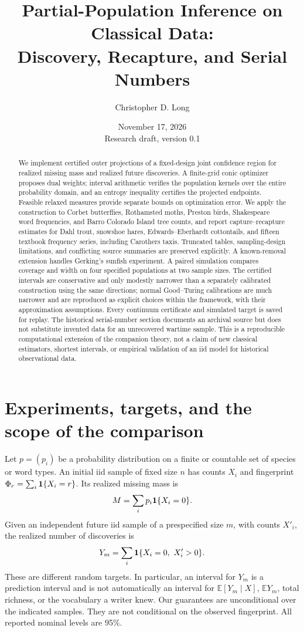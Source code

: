 \documentclass[11pt]{article}
\title{Partial-Population Inference on Classical Data:\\Discovery, Recapture, and Serial Numbers}
\author{Christopher D. Long}
\date{November 17, 2026\\Research draft, version 0.1}
\theoremstyle{remark}\newtheorem{remark}[theorem]{Remark}
\newcommand{\E}{\mathbb E}\newcommand{\PP}{\mathbb P}
\begin{document}
\maketitle
\begin{abstract}
We implement certified outer projections of a fixed-design joint confidence
region for realized missing mass and realized future discoveries. A finite-grid
conic optimizer proposes dual weights; interval arithmetic verifies the
population kernels over the entire probability domain, and an entropy
inequality certifies the projected endpoints. Feasible relaxed measures provide
separate bounds on optimization error. We apply the construction to Corbet
butterflies, Rothamsted moths, Preston birds, Shakespeare word frequencies, and
Barro Colorado Island tree counts, and report capture--recapture estimates for
Dahl trout, snowshoe hares, Edwards--Eberhardt cottontails, and fifteen textbook
frequency series, including Carothers taxis. Truncated tables, sampling-design
limitations, and conflicting source summaries are preserved explicitly. A
known-removal extension handles Gerking's sunfish experiment. A paired
simulation compares coverage and width on four specified populations
at two sample sizes. The certified intervals are conservative and only modestly
narrower than a separately calibrated construction using the same directions;
normal Good--Turing calibrations are much narrower and are reproduced as
explicit choices within the framework, with their approximation assumptions.
Every continuum certificate and simulated target is saved for replay.
The historical serial-number section documents an archival source but does not
substitute invented data for an unrecovered wartime sample. This is a reproducible
computational extension of the companion theory, not a claim of new classical
estimators, shortest intervals, or empirical validation of an iid model for
historical observational data.
\end{abstract}

\section{Experiments, targets, and the scope of the comparison}
Let $p=(p_i)$ be a probability distribution on a finite or countable set of
species or word types. An initial iid sample of fixed size $n$ has counts $X_i$
and fingerprint $\Phi_r=\sum_i\mathbf1\{X_i=r\}$. Its realized missing mass is
\[
 M=\sum_i p_i\mathbf1\{X_i=0\}.
\]
Given an independent future iid sample of a prespecified size $m$, with counts
$X'_i$, the realized number of discoveries is
\[
 Y_m=\sum_i\mathbf1\{X_i=0,\ X'_i>0\}.
\]
These are different random targets. In particular, an interval for $Y_m$ is
a prediction interval and is not automatically an interval for
$\E[Y_m\mid X]$, $\E Y_m$, total richness, or the vocabulary a writer knew.
Our guarantees are unconditional over the indicated samples. They are not
conditional on the observed fingerprint. All reported nominal levels are 95\%.
\end{document}
